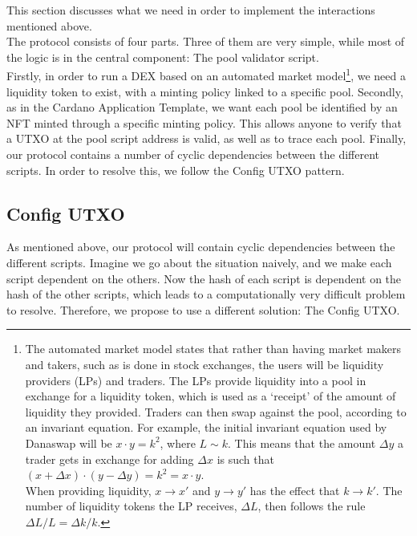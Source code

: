 \documentclass{article}
\begin{document}
This section discusses what we need in order to implement the interactions
mentioned above. \\


The protocol consists of four parts. Three of them are very simple, while most
of the logic is in the central component: The pool validator script. \\

Firstly, in order to run a DEX based on an automated market model\footnote{
  The automated market model states that rather than having market makers and
  takers, such as is done in stock exchanges, the users will be liquidity
  providers (LPs) and traders. The LPs provide liquidity into a pool in exchange
  for a liquidity token, which is used as a `receipt' of the amount of liquidity
  they provided. Traders can then swap against the pool, according to an
  invariant equation. For example, the initial invariant equation used by
  Danaswap will be $x \cdot y = k^2$, where $L \sim k$. This means that the
  amount $\Delta y$ a trader gets in exchange for adding $\Delta x$ is such that
  $(x + \Delta x) \cdot (y - \Delta y) = k^2 = x \cdot y$. \\

  When providing liquidity, $x \rightarrow x'$ and $y \rightarrow y'$ has the
  effect that $k \rightarrow k'$. The number of liquidity tokens the LP
  receives, $\Delta L$, then follows the rule $\Delta L / L = \Delta k / k$.
}, we need a liquidity token to exist, with a minting policy linked to a
specific pool.
Secondly, as in the Cardano Application Template, we want each pool be
identified by an NFT minted through a specific minting policy. This allows
anyone to verify that a UTXO at the pool script address is valid, as well as to
trace each pool.
Finally, our protocol contains a number of cyclic dependencies between the
different scripts. In order to resolve this, we follow the Config UTXO pattern.

\subsection{Config UTXO}

As mentioned above, our protocol will contain cyclic dependencies between the
different scripts. Imagine we go about the situation naively, and we make each
script dependent on the others. Now the hash of each script is dependent on the
hash of the other scripts, which leads to a computationally very difficult
problem to resolve. Therefore, we propose to use a different solution: The
Config UTXO. \\
\end{document}
